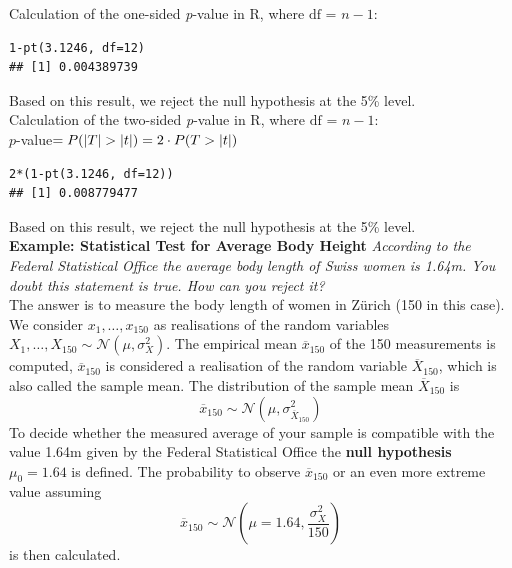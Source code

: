 \documentclass[11pt]{article}
\newcommand*\samplemean[1]{\overline{#1}}
\newcommand*\N[1]{\mathcal{N}\left(#1\right)}
\DeclarePairedDelimiter\abs{\lvert}{\rvert}
\begin{document}
\noindent
Calculation of the one-sided \textit{p}-value in R, where $\text{df = }n-1$: 
\begin{verbatim}
1-pt(3.1246, df=12)
## [1] 0.004389739
\end{verbatim}
Based on this result, we reject the  null hypothesis at the 5\% level.\\

\noindent
Calculation of the two-sided \textit{p}-value in R, where $\text{df = }n-1$:\\
$p$-value$ = P(\abs{T} > \abs{t}) = 2 \cdot P(T > \abs{t})$
\begin{verbatim}
2*(1-pt(3.1246, df=12))
## [1] 0.008779477
\end{verbatim}
Based on this result, we reject the  null hypothesis at the 5\% level.\\

\noindent
\textbf{Example: Statistical Test for Average Body Height}
\textit{According to the Federal Statistical Office the average body length of Swiss women is 1.64m. You doubt this statement is true. How can you reject it?}\\

\noindent
The answer is to measure the body length of women in Zürich (150 in this case). We consider $x_1,\dots,x_{150}$ as realisations of the random variables $X_1,\dots,X_{150} \sim \N{\mu, \sigma_X^2}$. The empirical mean $\samplemean{x}_{150}$ of the 150 measurements is computed, $\samplemean{x}_{150}$ is considered a realisation of the random variable $\samplemean{X}_{150}$, which is also called the sample mean. The distribution of the sample mean $\samplemean{X}_{150}$ is
\begin{equation*}
	\samplemean{x}_{150} \sim \N{\mu, \sigma_{\samplemean{X}_{150}}^2}
\end{equation*}
To decide whether the measured average of your sample is compatible with the value 1.64m given by the Federal Statistical Office the \textbf{null hypothesis} $\mu_0 = 1.64$ is defined. The probability to observe $\samplemean{x}_{150}$ or an even more extreme value assuming
\begin{equation*}
	\samplemean{x}_{150} \sim \N{\mu=1.64, \frac{\sigma_X^2}{150}}
\end{equation*}
is then calculated.
\end{document}
